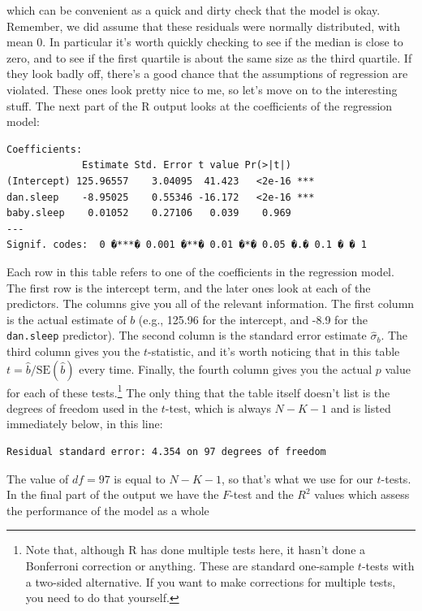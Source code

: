 \documentclass[
]{book}
\begin{document}
which can be convenient as a quick and dirty check that the model is okay. Remember, we did assume that these residuals were normally distributed, with mean 0. In particular it's worth quickly checking to see if the median is close to zero, and to see if the first quartile is about the same size as the third quartile. If they look badly off, there's a good chance that the assumptions of regression are violated. These ones look pretty nice to me, so let's move on to the interesting stuff. The next part of the R output looks at the coefficients of the regression model:

\begin{verbatim}
Coefficients:
             Estimate Std. Error t value Pr(>|t|)    
(Intercept) 125.96557    3.04095  41.423   <2e-16 ***
dan.sleep    -8.95025    0.55346 -16.172   <2e-16 ***
baby.sleep    0.01052    0.27106   0.039    0.969 
---
Signif. codes:  0 �***� 0.001 �**� 0.01 �*� 0.05 �.� 0.1 � � 1 
\end{verbatim}

Each row in this table refers to one of the coefficients in the regression model. The first row is the intercept term, and the later ones look at each of the predictors. The columns give you all of the relevant information. The first column is the actual estimate of \(b\) (e.g., 125.96 for the intercept, and -8.9 for the \texttt{dan.sleep} predictor). The second column is the standard error estimate \(\hat\sigma_b\). The third column gives you the \(t\)-statistic, and it's worth noticing that in this table \(t= \hat{b}/\mbox{SE}({\hat{b}})\) every time. Finally, the fourth column gives you the actual \(p\) value for each of these tests.\footnote{Note that, although R has done multiple tests here, it hasn't done a Bonferroni correction or anything. These are standard one-sample \(t\)-tests with a two-sided alternative. If you want to make corrections for multiple tests, you need to do that yourself.} The only thing that the table itself doesn't list is the degrees of freedom used in the \(t\)-test, which is always \(N-K-1\) and is listed immediately below, in this line:

\begin{verbatim}
Residual standard error: 4.354 on 97 degrees of freedom
\end{verbatim}

The value of \(df = 97\) is equal to \(N-K-1\), so that's what we use for our \(t\)-tests. In the final part of the output we have the \(F\)-test and the \(R^2\) values which assess the performance of the model as a whole
\end{document}

